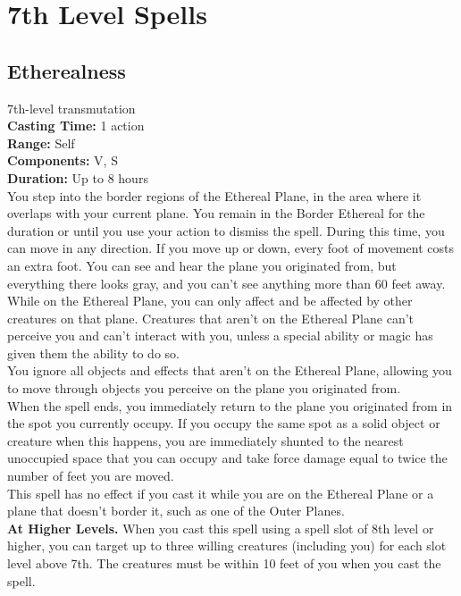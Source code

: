 \documentclass[11pt, A4paper, english]{article}
\begin{document}
	\section{7th Level Spells}
		\subsection{Etherealness}
7th-level transmutation \\
\textbf{Casting Time:} 1 action \\
\textbf{Range:} Self \\
\textbf{Components:} V, S \\
\textbf{Duration:} Up to 8 hours \\
You step into the border regions of the Ethereal Plane, in the area where it overlaps with your current plane. You remain in the Border Ethereal for the duration or until you use your action to dismiss the spell. During this time, you can move in any direction. If you move up or down, every foot of movement costs an extra foot. You can see and hear the plane you originated from, but everything there looks gray, and you can’t see anything more than 60 feet away. \\
While on the Ethereal Plane, you can only affect and be affected by other creatures on that plane. Creatures that aren't on the Ethereal Plane can’t perceive you and can’t interact with you, unless a special ability or magic has given them the ability to do so. \\
You ignore all objects and effects that aren’t on the Ethereal Plane, allowing you to move through objects you perceive on the plane you originated from. \\
When the spell ends, you immediately return to the plane you originated from in the spot you currently occupy. If you occupy the same spot as a solid object or creature when this happens, you are immediately shunted to the nearest unoccupied space that you can occupy and take force damage equal to twice the number of feet you are moved. \\
This spell has no effect if you cast it while you are on the Ethereal Plane or a plane that doesn’t border it, such as one of the Outer Planes. \\
\textbf{At Higher Levels.} When you cast this spell using a spell slot of 8th level or higher, you can target up to three willing creatures (including you) for each slot level above 7th. The creatures must be within 10 feet of you when you cast the spell.
\end{document}
